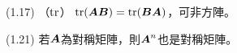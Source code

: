 \item \begin{theorem}{(1.17)} （$\operatorname{tr}$）
    $\operatorname{tr}(\boldsymbol{AB}) = \operatorname{tr}(\boldsymbol{BA})$，可非方陣。
\end{theorem}

\item \begin{theorem}{(1.21)} 若$\boldsymbol{A}$為對稱矩陣，則$\boldsymbol{A}^n$也是對稱矩陣。
\end{theorem}
